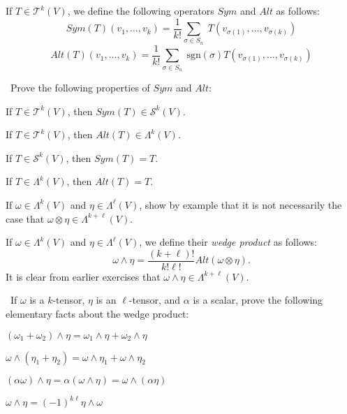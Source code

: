 \documentclass{book}
\begin{document}
\begin{definition}
If $T\in\mathcal{T}^k(V)$, we define the following operators $Sym$ and $Alt$ as follows:
$$Sym(T)(v_1,\ldots, v_k)=\frac{1}{k!}\sum_{\sigma\in S_n}\; T(v_{\sigma (1)}, \ldots, v_{\sigma (k)})$$
$$Alt(T)(v_1,\ldots, v_k)=\frac{1}{k!}\sum_{\sigma\in S_n}\; \mbox{sgn}(\sigma)
T(v_{\sigma (1)}, \ldots, v_{\sigma (k)})$$
\end{definition}

\begin{exercise}\
Prove the following properties of $Sym$ and $Alt$:
\begin{exerenm}
\item
If $T\in\mathcal{T}^k(V)$, then $Sym(T)\in\mathcal{S}^k(V)$.

\item
If $T\in\mathcal{T}^k(V)$, then $Alt(T)\in\Lambda^k(V)$.

\item
If $T\in\mathcal{S}^k(V)$, then $Sym(T)=T$.

\item
If $T\in\Lambda^k(V)$, then $Alt(T)=T$.
\end{exerenm}
\end{exercise}

\begin{exercise}
If $\omega\in\Lambda^k(V)$ and $\eta\in\Lambda^\ell(V)$, show by example
that it is not necessarily the case 
that $\omega\otimes\eta\in\Lambda^{k+\ell}(V)$.
\end{exercise}

\begin{definition}
If $\omega\in\Lambda^k(V)$ and $\eta\in\Lambda^\ell(V)$, we define their {\em wedge product}
as follows:
$$\omega\wedge\eta=\frac{(k+\ell)!}{k!\ell !} Alt(\omega\otimes\eta).$$
It is clear from earlier exercises that $\omega\wedge\eta\in\Lambda^{k+\ell}(V)$.
\end{definition}

\begin{exercise}\
If $\omega$ is a $k$-tensor, $\eta$ is an $\ell$-tensor, and $\alpha$ is a scalar, prove the following elementary facts about the wedge product:
\begin{exerenm}
\item
$(\omega_1+\omega_2)\wedge\eta = \omega_1\wedge\eta +\omega_2\wedge\eta$

\item
$\omega\wedge (\eta_1+\eta_2)=\omega\wedge\eta_1 +\omega\wedge\eta_2$

\item
$(\alpha\omega)\wedge\eta =\alpha(\omega\wedge\eta)=\omega\wedge (\alpha\eta)$

\item
$\omega\wedge\eta = (-1)^{k\ell}\eta\wedge\omega$
\end{exerenm}
\end{exercise}
\end{document}
